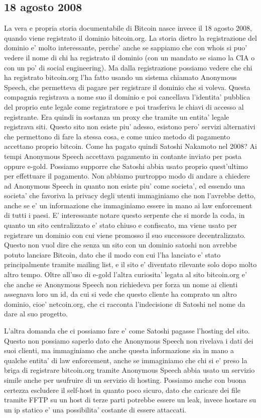 \documentclass{article}
\begin{document}
\subsection{18 agosto 2008}
La vera e propria storia documentabile di Bitcoin nasce invece il 18 agosto 2008, quando viene registrato il dominio bitcoin.org. La storia dietro la registrazione del dominio e' molto interessante, perche' anche se sappiamo che con whois si puo' vedere il nome di chi ha registrato il dominio (con un mandato se siamo la CIA o con un po' di social engineering). Ma dalla registrazione possiamo vedere che chi ha registrato bitcoin.org l'ha fatto usando un sistema chiamato Anonymous Speech, che permetteva di pagare per registrare il dominio che si voleva. Questa compagnia registrava a nome suo il dominio e poi cancellava l'identita' pubblica del proprio ente legale come registratore e poi trasferiva le chiavi di accesso al registrante. Era quindi in sostanza un proxy che tramite un entita' legale registrava siti. Questo sito non esiste piu' adesso, esistono pero' servizi alternativi che permettono di fare la stessa cosa, e come unico metodo di pagamento accettano proprio bitcoin. Come ha pagato quindi Satoshi Nakamoto nel 2008? Ai tempi Anonymous Speech accettava pagamento in contante inviato per posta oppure e-gold. Possiamo supporre che Satoshi abbia usato proprio quest'ultimo per effettuare il pagamento. Non abbiamo purtroppo modo di andare a chiedere ad Anonymous Speech in quanto non esiste piu' come societa', ed essendo una societa' che favoriva la privacy degli utenti immaginiamo che non l'avrebbe detto, anche se e' un informazione che immaginiamo essere in mano ai law enforcement di tutti i paesi. E' interessante notare questo serpente che si morde la coda, in quanto un sito centralizzato e' stato chiuso e confiscato, ma viene usato per registrare un dominio con cui viene promosso il suo successore decentralizzato. Questo non vuol dire che senza un sito con un dominio satoshi non avrebbe potuto lanciare Bitcoin, dato che il modo con cui l'ha lanciato e' stato principalmente tramite mailing list, e il sito e' diventato rilevante solo dopo molto altro tempo. Oltre all'uso di e-gold l'altra curiosita' legata al sito bitcoin.org e' che anche se Anonymous Speech non richiedeva per forza un nome ai clienti assegnava loro un id, da cui si vede che questo cliente ha comprato un altro dominio, cioe' netcoin.org, che ci racconta l'indecisione di Satoshi nel nome da dare al suo progetto.

L'altra domanda che ci possiamo fare e' come Satoshi pagasse l'hosting del sito. Questo non possiamo saperlo dato che Anonymous Speech non rivelava i dati dei suoi clienti, ma immaginiamo che anche questa informazione sia in mano a qualche entita' di law enforcement, anche se immaginiamo che chi si e' preso la briga di registrare bitcoin.org tramite Anonymous Speech abbia usato un servizio simile anche per usufruire di un servizio di hosting. Possiamo anche con buona certezza escludere il self-host in quanto poco sicuro, dato che caricare dei file tramite FFTP su un host di terze parti potrebbe essere un leak, invece hostare su un ip statico e' una possibilita' costante di essere attaccati.
\end{document}
